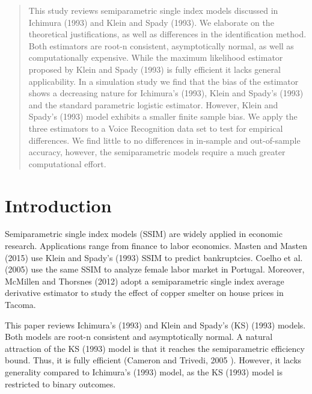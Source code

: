 \vspace{1cm}
\begin{abstract}

This study reviews semiparametric single index models discussed in Ichimura (1993) and Klein and Spady (1993). We elaborate on the theoretical justifications, as well as differences in the identification method. Both estimators are root-n consistent, asymptotically normal, as well as computationally expensive. While the maximum likelihood estimator proposed by Klein and Spady (1993) is fully efficient it lacks general applicability. In a simulation study we find that the bias of the estimator shows a decreasing nature for Ichimura's (1993), Klein and Spady's (1993) and the standard parametric logistic estimator. However, Klein and Spady's (1993) model exhibits a smaller finite sample bias. We apply the three estimators to a Voice Recognition data set to test for empirical differences. We find little to no differences in in-sample and out-of-sample accuracy, however, the semiparametric models require a much greater computational effort.

\end{abstract}


\newpage
    
\section{Introduction} %
\label{sec:introduction}

Semiparametric single index models (SSIM) are widely applied in economic research. Applications range from finance to labor economics. Masten and Masten (2015) \cite{[30]} use Klein and Spady's (1993) \cite{[12]} SSIM to predict bankruptcies. Coelho et al. (2005) \cite{[29]} use the same SSIM to analyze female labor market in Portugal. Moreover, McMillen and Thorsnes (2012) \cite{[31]} adopt a semiparametric single index average derivative estimator to study the effect of copper smelter on house prices in Tacoma.

This paper reviews Ichimura's (1993) \cite{[6]} and Klein and Spady's (KS) (1993) \cite{[12]} models. Both models are root-n consistent and asymptotically normal. A natural attraction of the KS (1993) \cite{[12]} model is that it reaches the semiparametric efficiency bound. Thus, it is fully efficient  (Cameron and Trivedi, 2005 \cite{[5]}). However, it lacks generality compared to Ichimura's (1993) \cite{[6]} model, as the KS (1993) \cite{[12]} model is restricted to binary outcomes.

